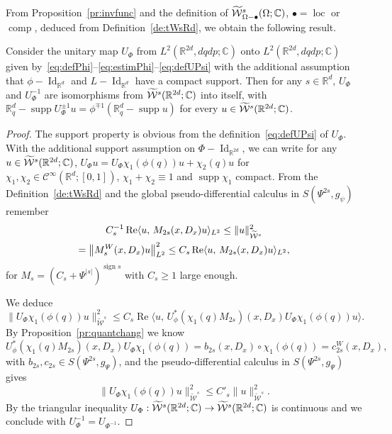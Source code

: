 \documentclass[AHL,Unicode,longabstracts]{cedram}
\newcommand{\C}{\mathbb{C}}
\newcommand{\R}{\mathbb{R}}
\newcommand{\clW}{\mathcal{W}}
\newcommand{\clC}{\mathcal{C}}
\DeclareMathOperator{\Ree}{Re}
\DeclareMathOperator{\ccomp}{comp}
\DeclareMathOperator{\suppp}{supp}
\DeclareMathOperator{\Idd}{Id}
\DeclareMathOperator{\locc}{loc}
\DeclareMathOperator{\ssign}{sign}
\let\oldtilde\tilde
\renewcommand*{\tilde}[1]{\mathchoice{\widetilde{#1}}{\widetilde{#1}}{\oldtilde{#1}}{\oldtilde{#1}}}
\let\originalleft\left
\let\originalright\right
\renewcommand{\left}{\mathopen{}\mathclose\bgroup\originalleft}
\renewcommand{\right}{\aftergroup\egroup\originalright}
\renewcommand*{\to}{\mathchoice{\longrightarrow}{\rightarrow}{\rightarrow}{\rightarrow}}
\begin{document}
From Proposition~\ref{pr:invfunc} and the definition of $\tilde{\clW}^{s}_{\Omega-\bullet}(\Omega;\C)$, $\bullet=\locc$ or $\ccomp$, deduced from Definition~\ref{de:tWsRd}, we obtain the following result.

\begin{prop}\label{pr:diffeoWsloc}
Consider the unitary map $U_{\Phi}$ from $L^{2}(\R^{2d},dqdp;\C)$ onto $ L^{2}(\R^{2d},dqdp;\C)$ given by~\eqref{eq:defPhi}--\eqref{eq:estimPhi}--\eqref{eq:defUPsi} with the additional assumption that $\phi-\Idd_{\R^{d}}$ and $L-\Idd_{\R^{d}}$ have a compact support. Then for any $s\in \R^{d}$, $U_{\Phi}$ and $U_{\Phi}^{-1}$ are isomorphisms from $\tilde{\clW}^{s}(\R^{2d};\C)$ into itself, with $\R^{d}_{q}-\suppp U_{\Phi}^{\pm 1}u=\phi^{\mp 1}(\R^{d}_{q}-\suppp u)$ for every $u\in \tilde{\clW}^{s}(\R^{2d};\C)$.
\end{prop}
\begin{proof}
The support property is obvious from the definition~\eqref{eq:defUPsi} of $U_{\Phi}$. With the additional support assumption on $\Phi-\Idd_{\R^{2d}}$, we can write for any $u\in \tilde{\clW}^{s}(\R^{2d};\C)$, $U_{\Phi}u=U_{\Phi}\chi_{1}(\phi(q))u + \chi_{2}(q)u$ for $\chi_{1},\chi_{2}\in \clC^{\infty}(\R^{d};[0,1])$, $\chi_{1}+\chi_{2}\equiv 1$ and $\suppp\chi_{1}$ compact. From the Definition~\ref{de:tWsRd} and the global pseudo-differential calculus in $S(\Psi^{2s},g_{\psi})$ remember
\begin{multline*}
C_{s}^{-1}\Ree\langle u,\, M_{2s}(x,D_{x})u\rangle_{L^{2}}\leq \|u\|_{\widetilde{\clW}^{s}}^{2}\\
=\left\|M_{s}^{W}(x,D_{x})u\right\|^{2}_{L^{2}}\leq C_{s}\Ree\langle u,\, M_{2s}(x,D_{x})u\rangle_{L^{2}},
\end{multline*}
for $M_{s}=(C_{s}+\Psi^{|s|})^{\ssign s}$ with $C_{s}\geq 1$ large enough.

We deduce
\[
\|U_{\Phi}\chi_{1}(\phi(q))u\|_{\widetilde{\clW}^{s}}^{2}\leq C_{s}\Ree\bigl\langle u,\, U_{\phi}^{*}(\chi_{1}(q)M_{2s})(x,D_{x})U_{\Phi}\chi_{1}(\phi(q))u\bigr\rangle.
\]
By Proposition~\ref{pr:quantchang} we know
\[
U_{\phi}^{*}(\chi_{1}(q)M_{2s})(x,D_{x})U_{\Phi}\chi_{1}(\phi(q))=b_{2s}(x,D_{x})\circ \chi_{1}(\phi(q))=c^{W}_{2s}(x,D_{x}),
\]
with $b_{2s},c_{2s}\in S(\Psi^{2s},g_{\Psi})$, and the pseudo-differential calculus in $S(\Psi^{2s},g_{\Psi})$ gives
\[
\|U_{\Phi}\chi_{1}(\phi(q))u\|_{\widetilde{\clW}^{s}}^{2}\leq C'_{s}\|u\|^{2}_{\widetilde{\clW}^{s}}.
\]
By the triangular inequality $U_{\Phi}:\tilde{\clW}^{s}(\R^{2d};\C)\to \tilde{\clW}^{s}(\R^{2d};\C)$ is continuous and we conclude with $U_{\Phi}^{-1}=U_{\Phi^{-1}}$.
\end{proof}
\end{document}
